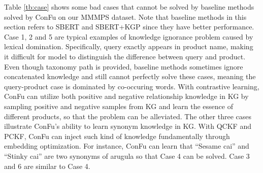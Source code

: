 Table \ref{tb:case} shows some bad cases that cannot be solved by baseline methods solved by ConFu on our MMMPS dataset. Note that baseline methods in this section refers to SBERT and SBERT+KGP since they have better performance. Case 1, 2 and 5 are typical examples of knowledge ignorance problem caused by lexical domination. Specifically, query exactly appears in product name, making it difficult for model to distinguish the difference between query and product. Even though taxonomy path is provided, baseline methods sometimes ignore concatenated knowledge and still cannot perfectly solve these cases, meaning the query-product case is dominated by co-occuring words. With contrastive learning, ConFu can utilize both positive and negative relationship knowledge in KG by sampling positive and negative samples from KG and learn the essence of different products, so that the problem can be alleviated. The other three cases illustrate ConFu's ability to learn synonym knowledge in KG. With QCKF and PCKF, ConFu can inject such kind of knowledge fundamentally through embedding optimization. For instance, ConFu can learn that ``Sesame cai'' and ``Stinky cai'' are two synonyms of arugula so that Case 4 can be solved. Case 3 and 6 are similar to Case 4.

